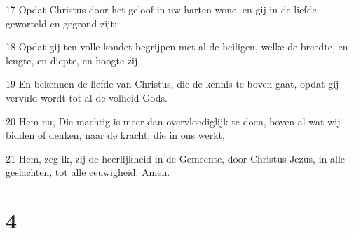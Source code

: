 \par 17 Opdat Christus door het geloof in uw harten wone, en gij in de liefde geworteld en gegrond zijt;
\par 18 Opdat gij ten volle kondet begrijpen met al de heiligen, welke de breedte, en lengte, en diepte, en hoogte zij,
\par 19 En bekennen de liefde van Christus, die de kennis te boven gaat, opdat gij vervuld wordt tot al de volheid Gods.
\par 20 Hem nu, Die machtig is meer dan overvloediglijk te doen, boven al wat wij bidden of denken, naar de kracht, die in ons werkt,
\par 21 Hem, zeg ik, zij de heerlijkheid in de Gemeente, door Christus Jezus, in alle geslachten, tot alle eeuwigheid. Amen.

\chapter{4}

